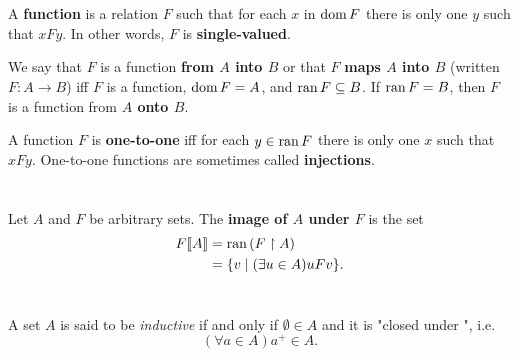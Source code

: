\documentclass{report}
\begin{document}
\section{}%

  A \textbf{function} is a relation $F$ such that for each $x$ in $\mathop{\text{dom}}{F}$
    there is only one $y$ such that $xFy$.
  In other words, $F$ is \textbf{single-valued}.

  We say that $F$ is a function \textbf{from $A$ into $B$} or that $F$
    \textbf{maps $A$ into $B$} (written $F \colon A \rightarrow B$) iff $F$ is a
    function, $\mathop{\text{dom}}{F} = A$, and $\mathop{\text{ran}}{F} \subseteq B$.
  If $\mathop{\text{ran}}{F} = B$, then $F$ is a function from \textbf{$A$ onto $B$}.

  A function $F$ is \textbf{one-to-one} iff for each $y \in \mathop{\text{ran}}{F}$ there is
    only one $x$ such that $xFy$.
  One-to-one functions are sometimes called \textbf{injections}.




\section{}%

  Let $A$ and $F$ be arbitrary sets.
  The \textbf{image of $A$ under $F$} is the set
    \begin{align*}
      F\!\left\llbracket A\right\rrbracket
        & = \mathop{\text{ran}}{(F \restriction A)} \\
        & = \{v \mid (\exists u \in A) uFv\}.
    \end{align*}



\section{}%

  A set $A$ is said to be \textit{inductive} if and only if $\emptyset \in A$
    and it is "closed under ", i.e.
    $$(\forall a \in A) a^+ \in A.$$

\end{document}
